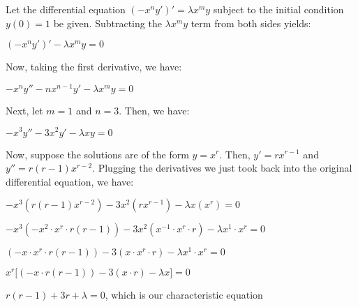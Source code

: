 \documentclass[executivepaper]{article}
\begin{document}
\vspace*{-40mm}

\begin{flushleft}

Let the differential equation $(-x^ny')'=\lambda x^my$ subject to the initial condition $y(0)=1$ be given. Subtracting the $\lambda x^my$ term from both sides yields:

\begin{center}

$(-x^ny')'-\lambda x^my=0$

\end{center}

Now, taking the first derivative, we have:

\begin{center}

$-x^ny''-nx^{n-1}y'-\lambda x^my=0$

\end{center}

Next, let $m=1$ and $n=3$. Then, we have:

\begin{center}

$-x^3y''-3x^2y'-\lambda xy=0$

\end{center}

Now, suppose the solutions are of the form $y=x^r$. Then, $y'=rx^{r-1}$ and $y''=r(r-1)x^{r-2}$. Plugging the derivatives we just took back into the original differential equation, we have:

\begin{center}

$-x^3(r(r-1)x^{r-2})-3x^2(rx^{r-1})-\lambda x(x^r)=0$

\hspace{1mm}

$-x^3(-x^2 \cdot x^r \cdot r(r-1))-3x^2(x^{-1} \cdot x^r \cdot r)-\lambda x^1 \cdot x^r=0$

\hspace{1mm}

$(-x \cdot x^r \cdot r(r-1))-3(x \cdot x^r \cdot r)-\lambda x^1 \cdot x^r=0$

\hspace{1mm}

$x^r \bigg[(-x \cdot r(r-1))-3(x \cdot r)-\lambda x \bigg]=0$

\hspace{1mm}

$r(r-1)+3r+\lambda=0$, which is our characteristic equation


\end{center}
\end{flushleft}
\end{document}
